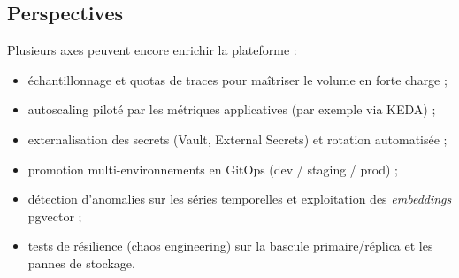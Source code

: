 \subsection*{Perspectives}
Plusieurs axes peuvent encore enrichir la plateforme :
\begin{itemize}
    \item échantillonnage et quotas de traces pour maîtriser le volume en forte charge ;
    \item autoscaling piloté par les métriques applicatives (par exemple via KEDA) ;
    \item externalisation des secrets (Vault, External Secrets) et rotation automatisée ;
    \item promotion multi-environnements en GitOps (dev / staging / prod) ;
    \item détection d’anomalies sur les séries temporelles et exploitation des \emph{embeddings} pgvector ;
    \item tests de résilience (chaos engineering) sur la bascule primaire/réplica et les pannes de stockage.
\end{itemize}
